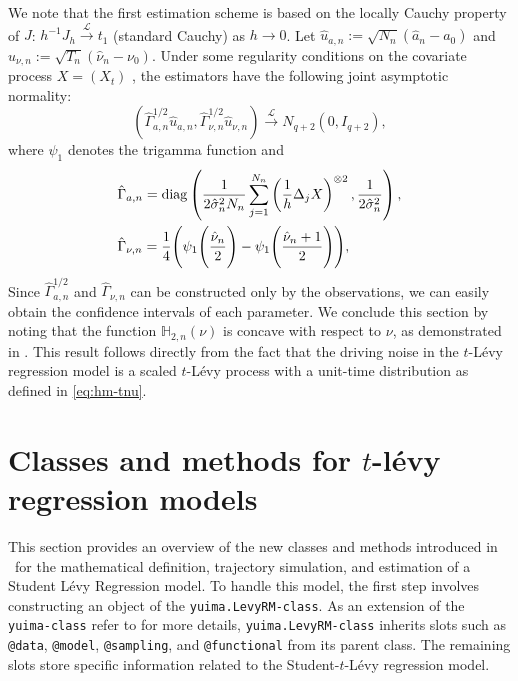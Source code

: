 We note that the first estimation scheme is based on the locally Cauchy property of \(J\): \(h^{-1}J_h\xrightarrow{\mathcal{L}}t_1\) (standard Cauchy) as \(h \to 0\).
Let \(\hat{u}_{a,n}:=\sqrt{N_n}(\hat{a}_n-a_0)\) and \(\hat{u}_{\nu,n}:=\sqrt{T_n}(\hat{\nu}_n-\nu_0)\).
Under some regularity conditions on the covariate process \(X=\left(X_t\right)\) \citep[see][ Assumption 2.1 in for all requirements on \(X\)]{masuda2023quasilikelihood}, the estimators have the following joint asymptotic normality:
\[(\hat{\Gamma}_{a,n}^{1/2}\hat{u}_{a,n}, \hat{\Gamma}_{\nu,n}^{1/2}\hat{u}_{\nu,n})\xrightarrow{\mathcal{L}}N_{q+2}(0,I_{q+2}),\]
where \(\psi_1\) denotes the trigamma function and
\begin{align*}
&\hat{\Gamma}_{a,n}={\rm diag}\left(\frac{1}{2\hat{\sigma}_n^2N_n}\sum_{j=1}^{N_n} \left(\frac{1}{h}\Delta_j X\right)^{\otimes2}, \frac{1}{2\hat{\sigma}_n^2}\right),\\
& \hat{\Gamma}_{\nu,n}=\frac{1}{4}\Bigg(\psi_1\Bigg(\frac{\hat{\nu}_n}{2}\Bigg)-\psi_1\Bigg(\frac{\hat{\nu}_n+1}{2}\Bigg)\Bigg),
\end{align*}
Since \(\hat{\Gamma}_{a,n}^{1/2}\) and \(\hat{\Gamma}_{\nu,n}\) can be constructed only by the observations, we can easily obtain the confidence intervals of each parameter.\newline
We conclude this section by noting that the function \(\mathbb{H}_{2,n}(\nu)\) is concave with respect to \(\nu\), as demonstrated in \citet{masuda2023quasilikelihood}. This result follows directly from the fact that the driving noise in the \(t\)-Lévy regression model is a scaled \(t\)-Lévy process with a unit-time distribution as defined in \eqref{eq:hm-tnu}.

\section{\texorpdfstring{Classes and methods for \(t\)-lévy regression models}{Classes and methods for t-lévy regression models}}\label{SectN1}

This section provides an overview of the new classes and methods introduced in  ~for the mathematical definition, trajectory simulation, and estimation of a Student Lévy Regression model. To handle this model, the first step involves constructing an object of the \texttt{yuima.LevyRM-class}. As an extension of the \texttt{yuima-class} refer to \citet{JSSv057i04} for more details, \texttt{yuima.LevyRM-class} inherits slots such as \texttt{@data}, \texttt{@model}, \texttt{@sampling}, and \texttt{@functional} from its parent class. The remaining slots store specific information related to the Student-\(t\)-Lévy regression model.

